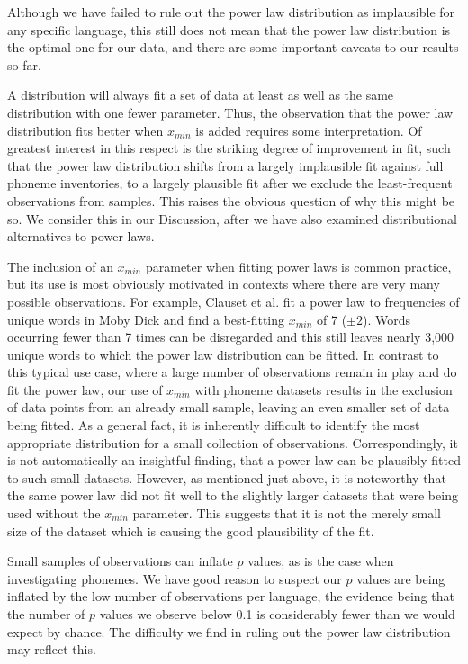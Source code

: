 Although we have failed to rule out the power law distribution as implausible for any specific language, this still does not mean that the power law distribution is the optimal one for our data, and there are some important caveats to our results so far.

A distribution will always fit a set of data at least as well as the same distribution with one fewer parameter. Thus, the observation that the power law distribution fits better when \(x_{min}\) is added requires some interpretation. Of greatest interest in this respect is the striking degree of improvement in fit, such that the power law distribution shifts from a largely implausible fit against full phoneme inventories, to a largely plausible fit after we exclude the least-frequent observations from samples. This raises the obvious question of why this might be so. We consider this in our Discussion, after we have also examined distributional alternatives to power laws.

The inclusion of an \(x_{min}\) parameter when fitting power laws is common practice, but its use is most obviously motivated in contexts where there are very many possible observations. For example, Clauset et al. \autocite*[p.~684]{clauset_power-law_2009} fit a power law to frequencies of unique words in Moby Dick and find a best-fitting \(x_{min}\) of 7 (\(\pm2\)). Words occurring fewer than 7 times can be disregarded and this still leaves nearly 3,000 unique words to which the power law distribution can be fitted. In contrast to this typical use case, where a large number of observations remain in play and do fit the power law, our use of \(x_{min}\) with phoneme datasets results in the exclusion of data points from an already small sample, leaving an even smaller set of data being fitted. As a general fact, it is inherently difficult to identify the most appropriate distribution for a small collection of observations. Correspondingly, it is not automatically an insightful finding, that a power law can be plausibly fitted to such small datasets. However, as mentioned just above, it is noteworthy that the same power law did not fit well to the slightly larger datasets that were being used without the \(x_{min}\) parameter. This suggests that it is not the merely small size of the dataset which is causing the good plausibility of the fit.

Small samples of observations can inflate \(p\) values, as is the case when investigating phonemes. We have good reason to suspect our \(p\) values are being inflated by the low number of observations per language, the evidence being that the number of \(p\) values we observe below 0.1 is considerably fewer than we would expect by chance. The difficulty we find in ruling out the power law distribution may reflect this.

